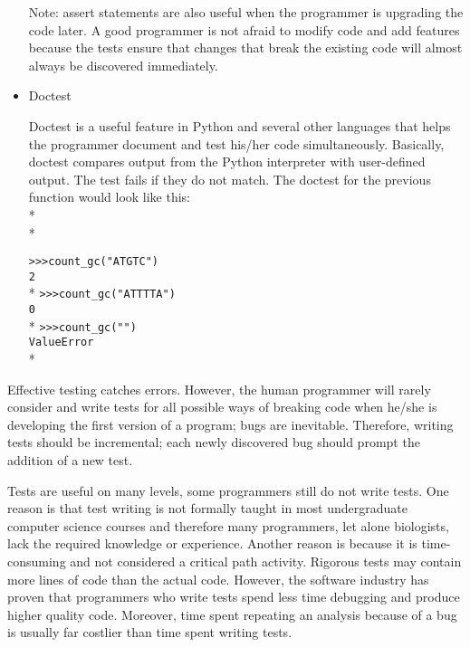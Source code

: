 \documentclass[ChapterTOCs,krantz2]{krantz} %
\begin{document}
\begin{itemize}
Note: assert
statements are also useful 
when the programmer is upgrading the code later.
A good programmer is not afraid to modify code and add features because the
tests ensure that changes that break the existing code will almost always
be discovered immediately.

\item Doctest

Doctest is a useful feature in Python and several other languages that helps the 
programmer document
and test his/her code simultaneously. Basically, doctest compares output
from the Python interpreter with user-defined output. The test fails if they do
not match. The doctest for the previous function would look like this:\\*\\*

\texttt{>>>count\_gc("ATGTC") \\2}\\*
\texttt{>>>count\_gc("ATTTTA") \\0}\\*
\texttt{>>>count\_gc("")\\ValueError}\\*

\end{itemize}

Effective testing catches errors. However, the human programmer will
rarely consider and write tests for all possible ways of breaking code when
he/she is developing the first version of a program; bugs are inevitable.
Therefore, writing tests should be incremental; each newly discovered bug
should prompt the addition of a new test.

Tests are useful on many levels, some programmers still do not
write tests.  One reason is that test writing is not formally taught in most
undergraduate computer science courses and therefore many programmers, let
alone biologists, lack the required knowledge or experience.  Another reason is
because it is time-consuming and not considered a critical path activity.
Rigorous tests may contain more lines of code than the actual code. 
However, the software industry has proven that 
programmers who write tests 
spend less time debugging and produce higher quality code.
Moreover, time spent repeating an analysis because of a bug is usually far
costlier than time spent writing tests.
\end{document}
